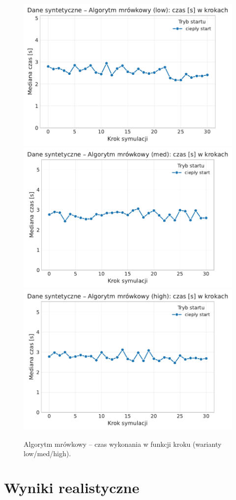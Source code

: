 \begin{figure}[H]
  \centering
  \includegraphics[width=0.62\linewidth]{assets/figures/dynamic/synthetic/synthetic_algorytm_mrowkowy_time_over_steps_low.pdf}\\[0.4em]
  \includegraphics[width=0.62\linewidth]{assets/figures/dynamic/synthetic/synthetic_algorytm_mrowkowy_time_over_steps_med.pdf}\\[0.4em]
  \includegraphics[width=0.62\linewidth]{assets/figures/dynamic/synthetic/synthetic_algorytm_mrowkowy_time_over_steps_high.pdf}
  \caption{Algorytm mrówkowy -- czas wykonania w funkcji kroku (warianty low/med/high).}
  \label{fig:dyn-synth-aco-time}
\end{figure}

\section{Wyniki realistyczne}

